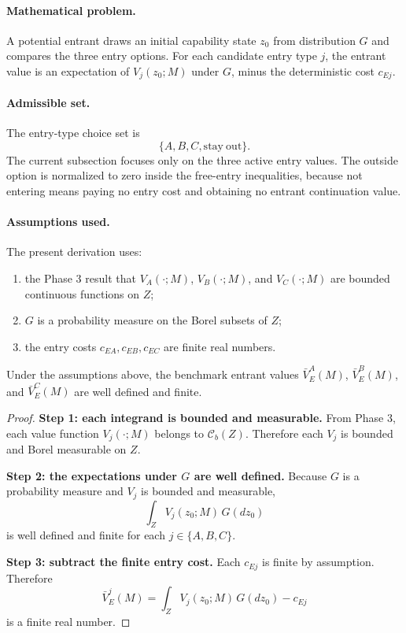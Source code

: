 \paragraph{Mathematical problem.}
A potential entrant draws an initial capability state $z_0$ from distribution $G$ and compares the three entry options. For each candidate entry type $j$, the entrant value is an expectation of $V_j(z_0;M)$ under $G$, minus the deterministic cost $c_{Ej}$.

\paragraph{Admissible set.}
The entry-type choice set is
\[
\{A,B,C,\mathrm{stay\ out}\}.
\]
The current subsection focuses only on the three active entry values. The outside option is normalized to zero inside the free-entry inequalities, because not entering means paying no entry cost and obtaining no entrant continuation value.

\paragraph{Assumptions used.}
The present derivation uses:
\begin{enumerate}
    \item the Phase 3 result that $V_A(\cdot;M)$, $V_B(\cdot;M)$, and $V_C(\cdot;M)$ are bounded continuous functions on $Z$;
    \item $G$ is a probability measure on the Borel subsets of $Z$;
    \item the entry costs $c_{EA},c_{EB},c_{EC}$ are finite real numbers.
\end{enumerate}

\begin{proposition}
Under the assumptions above, the benchmark entrant values $\bar V_E^A(M)$, $\bar V_E^B(M)$, and $\bar V_E^C(M)$ are well defined and finite.
\end{proposition}

\begin{proof}
\medskip\noindent\textbf{Step 1: each integrand is bounded and measurable.}
From Phase 3, each value function $V_j(\cdot;M)$ belongs to $\mathcal C_b(Z)$. Therefore each $V_j$ is bounded and Borel measurable on $Z$.

\medskip\noindent\textbf{Step 2: the expectations under $G$ are well defined.}
Because $G$ is a probability measure and $V_j$ is bounded and measurable,
\[
\int_Z V_j(z_0;M)\,G(dz_0)
\]
is well defined and finite for each $j\in\{A,B,C\}$.

\medskip\noindent\textbf{Step 3: subtract the finite entry cost.}
Each $c_{Ej}$ is finite by assumption. Therefore
\[
\bar V_E^j(M)=\int_Z V_j(z_0;M)\,G(dz_0)-c_{Ej}
\]
is a finite real number.
\end{proof}

